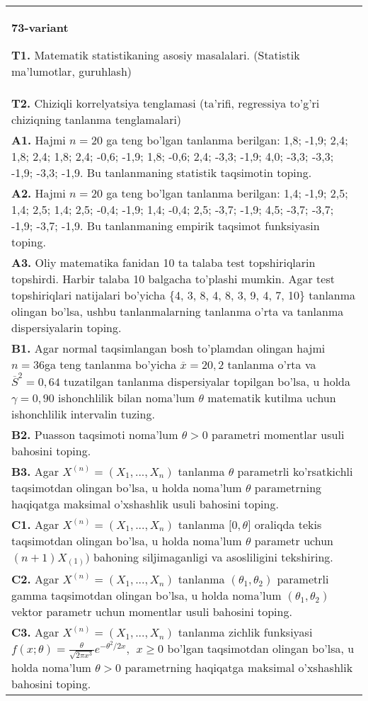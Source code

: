 \documentclass{article}
\begin{document}
\vspace{1cm}


\begin{tabular}{m{17cm}}
\textbf{73-variant}
\newline

\textbf{T1.} Matematik statistikaning asosiy masalalari. (Statistik ma'lumotlar, guruhlash)
\\
\textbf{T2.} 
Chiziqli korrelyatsiya tenglamasi (ta'rifi, regressiya to'g'ri chiziqning tanlanma tenglamalari)
\\
\textbf{A1.} 
Hajmi \(n = 20\) ga teng bo'lgan tanlanma berilgan: 1,8; -1,9; 2,4; 1,8; 2,4; 1,8; 2,4; -0,6; -1,9; 1,8; -0,6; 2,4; -3,3; -1,9; 4,0; -3,3; -3,3; -1,9; -3,3; -1,9. Bu tanlanmaning statistik taqsimotin toping.
\\
\textbf{A2.} 
Hajmi \(n = 20\) ga teng bo'lgan tanlanma berilgan: 1,4; -1,9; 2,5; 1,4; 2,5; 1,4; 2,5; -0,4; -1,9; 1,4; -0,4; 2,5; -3,7; -1,9; 4,5; -3,7; -3,7; -1,9; -3,7; -1,9. Bu tanlanmaning empirik taqsimot funksiyasin toping.
\\
\textbf{A3.} 
Oliy matematika fanidan 10 ta talaba test topshiriqlarin topshirdi. Harbir talaba 10 balgacha to'plashi mumkin. Agar test topshiriqlari natijalari bo'yicha \{4, 3, 8, 4, 8, 3, 9, 4, 7, 10\} tanlanma olingan bo'lsa, ushbu tanlanmalarning tanlanma o'rta va tanlanma dispersiyalarin toping.
\\
\textbf{B1.} 
Agar normal taqsimlangan bosh to'plamdan olingan hajmi \(n = 36\)ga teng tanlanma bo'yicha \(\overline{x} = 20,2\) tanlanma o'rta va \({\overline{S}}^{2} = 0,64\) tuzatilgan tanlanma dispersiyalar topilgan bo'lsa, u holda \(\gamma = 0,90\) ishonchlilik bilan noma'lum \(\theta\) matematik kutilma uchun ishonchlilik intervalin tuzing.
\\
\textbf{B2.} 
Puasson taqsimoti noma'lum \(\theta > 0\) parametri momentlar usuli bahosini toping.
\\
\textbf{B3.} 
Agar \(X^{(n)} = \left( X_{1},...,X_{n} \right)\) tanlanma \(\theta\) parametrli ko'rsatkichli taqsimotdan olingan bo'lsa, u holda noma'lum \(\theta\) parametrning haqiqatga maksimal o'xshashlik usuli bahosini toping.
\\
\textbf{C1.} 
Agar \(X^{(n)} = \left( X_{1},...,X_{n} \right)\) tanlanma \(\lbrack 0,\theta\rbrack\) oraliqda tekis taqsimotdan olingan bo'lsa, u holda noma'lum \(\theta\) parametr uchun \((n + 1)X_{(1)})\) bahoning siljimaganligi va asosliligini tekshiring.
\\
\textbf{C2.} 
Agar \(X^{(n)} = \left( X_{1},...,X_{n} \right)\) tanlanma \(\left( \theta_{1},\theta_{2} \right)\) parametrli gamma taqsimotdan olingan bo'lsa, u holda noma'lum \(\left( \theta_{1},\theta_{2} \right)\) vektor parametr uchun momentlar usuli bahosini toping.
\\
\textbf{C3.} 
Agar \(X^{(n)} = \left( X_{1},...,X_{n} \right)\) tanlanma zichlik funksiyasi \(f(x;\theta) = \frac{\theta}{\sqrt{2\pi x^{3}}}e^{- \theta^{2}/2x},\ \ x \geq 0\) bo'lgan taqsimotdan olingan bo'lsa, u holda noma'lum \(\theta > 0\) parametrning haqiqatga maksimal o'xshashlik bahosini toping.
\\

\end{tabular}
\end{document}
